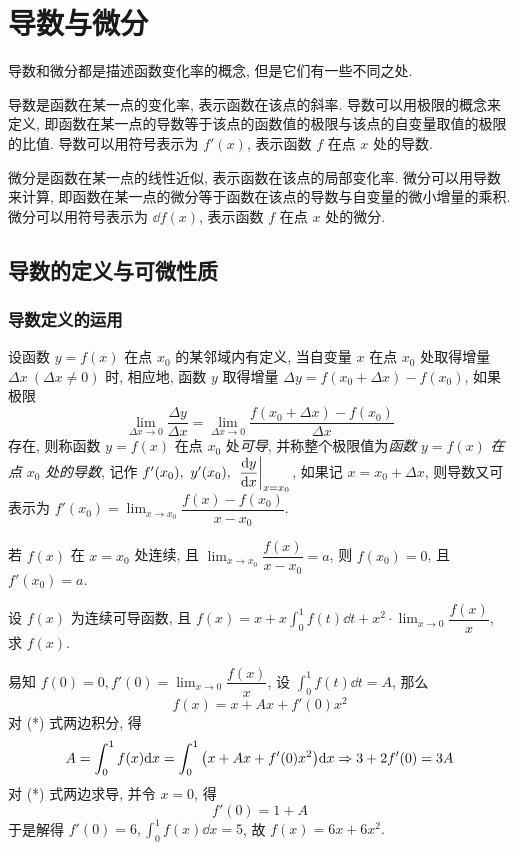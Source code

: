 \section{导数与微分}

导数和微分都是描述函数变化率的概念, 但是它们有一些不同之处.

导数是函数在某一点的变化率, 表示函数在该点的斜率.
导数可以用极限的概念来定义, 即函数在某一点的导数等于该点的函数值的极限与该点的自变量取值的极限的比值.
导数可以用符号表示为 $f'(x)$, 表示函数 $f$ 在点 $x$ 处的导数.

微分是函数在某一点的线性近似, 表示函数在该点的局部变化率.
微分可以用导数来计算, 即函数在某一点的微分等于函数在该点的导数与自变量的微小增量的乘积.
微分可以用符号表示为 $\dd f(x)$, 表示函数 $f$ 在点 $x$ 处的微分.

\subsection{导数的定义与可微性质}

\subsubsection{导数定义的运用}

\begin{definition}[导数]
    设函数 $y=f(x)$ 在点 $x_0$ 的某邻域内有定义, 当自变量 $x$ 在点 $x_0$ 处取得增量 $\Delta x~(\Delta x\neq 0)$ 时, 相应地, 函数 $y$ 取得增量 $\Delta y=f(x_0+\Delta x)-f(x_0)$, 如果极限
    \label{theDefinitionOfTheDerivationFunction}
    $$\lim_{\Delta x\to0}\dfrac{\Delta y}{\Delta x}=\lim_{\Delta x\to0}\dfrac{f(x_0+\Delta x)-f(x_0)}{\Delta x}$$
    存在, 则称函数 $y=f(x)$ 在点 $x_0$ 处\textit{可导}, 并称整个极限值为\textit{函数} $y=f(x)$ \textit{在点} $x_0$ \textit{处的导数}, 记作 $f'(x_0),~y'(x_0),~\eval{\dfrac{\dd y}{\dd x}}_{x=x_0}$,
    如果记 $x=x_0+\Delta x$, 则导数又可表示为 $f'(x_0)=\displaystyle\lim_{x\to x_0}\dfrac{f(x)-f(x_0)}{x-x_0}.$
\end{definition}

\begin{theorem}[导数与极限式]
    若 $f(x)$ 在 $x=x_0$ 处连续, 且 $\displaystyle \lim_{x \to x_0}\dfrac{f(x)}{x-x_0}=a$, 则 $f(x_0)=0$, 且 $f'(x_0)=a.$
\end{theorem}

\begin{example}
    设 $f(x)$ 为连续可导函数, 且 $\displaystyle f(x)=x+x\int_{0}^{1} f(t) \dd t+x^2\cdot\lim_{x \to 0}\dfrac{f(x)}{x}$, 求 $f(x)$.
\end{example}
\begin{solution}
    易知 $f(0)=0, f'(0)=\displaystyle \lim_{x \to 0}\dfrac{f(x)}{x}$, 设 $\displaystyle \int_{0}^{1} f(t) \dd t=A$, 那么 
    \begin{equation*}
        f(x)=x+Ax+f'(0)x^2
        \tag{*}
    \end{equation*}
    对 (*) 式两边积分, 得 $$\displaystyle A=\int_{0}^{1} f(x) \dd x=\int_{0}^{1} \qty(x+Ax+f'(0)x^2) \dd x \Rightarrow 3+2f'(0)=3A$$
    对 (*) 式两边求导, 并令 $x=0$, 得 $$f'(0)=1+A$$
    于是解得 $f'(0)=6, \displaystyle \int_{0}^{1} f(x) \dd x=5$, 故 $f(x)=6x+6x^2.$
\end{solution}

